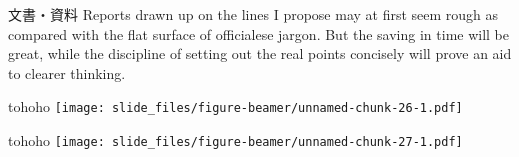 \documentclass[
  ignorenonframetext,
]{beamer}
\begin{document}
\begin{frame}{文書・資料}
\protect\hypertarget{ux6587ux66f8ux8cc7ux6599-2}{}
Reports drawn up on the lines I propose may at first seem rough as
compared with the flat surface of officialese jargon. But the saving in
time will be great, while the discipline of setting out the real points
concisely will prove an aid to clearer thinking.
\end{frame}

\begin{frame}{tohoho}
\protect\hypertarget{tohoho}{}
\texttt{[image: slide\_files/figure-beamer/unnamed-chunk-26-1.pdf]}
\end{frame}

\begin{frame}{tohoho}
\protect\hypertarget{tohoho-1}{}
\texttt{[image: slide\_files/figure-beamer/unnamed-chunk-27-1.pdf]}
\end{frame}
\end{document}
